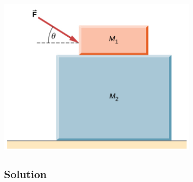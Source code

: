 \documentclass[12pt]{article}
\begin{document}
\begin{center}
    \includegraphics*[width=10cm]{graph_7.png}
\end{center}

\subsection*{Solution}
\end{document}
